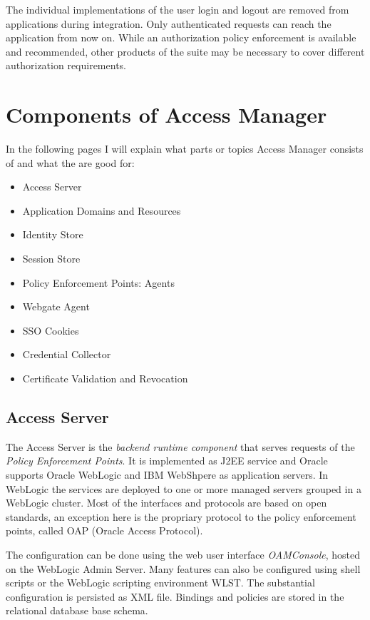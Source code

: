 The individual implementations of the user login and logout are removed
from applications during integration. Only authenticated requests can
reach the application from now on. While an authorization policy
enforcement is available and recommended, other products of the suite
may be necessary to cover different authorization requirements.




\section{Components of Access Manager}

In the following pages I will explain what parts or topics Access
Manager consists of and what the are good for:

\begin{itemize}
    \item Access Server
    \item Application Domains and Resources
    \item Identity Store
    \item Session Store
    \item Policy Enforcement Points: Agents
    \item Webgate Agent
    \item SSO Cookies
    \item Credential Collector
    \item Certificate Validation and Revocation
\end{itemize}




\subsection{Access Server}

The Access Server is the \emph{backend runtime component} that serves
requests of the \emph{Policy Enforcement Points}. It is implemented as
J2EE service and Oracle supports Oracle WebLogic and IBM WebShpere as
application servers. In WebLogic the services are deployed to one or
more managed servers grouped in a WebLogic cluster.  Most of the
interfaces and protocols are based on open standards, an exception here
is the propriary protocol to the policy enforcement points, called OAP
(Oracle Access Protocol).

The configuration can be done using the web user interface 
\emph{OAMConsole}, hosted on the WebLogic Admin Server. Many features
can also be configured using shell scripts or the WebLogic scripting
environment WLST\@. The substantial configuration is persisted as XML
file. Bindings and policies are stored in the relational database base
schema.


